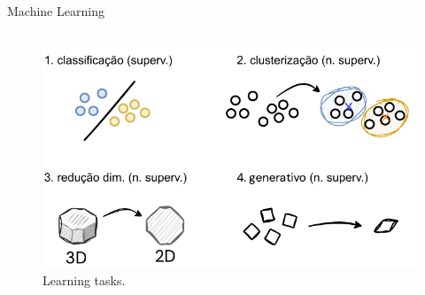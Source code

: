 \documentclass[aspectratio=169,xcolor=dvipsnames]{beamer}
\begin{document}
\begin{frame}{Machine Learning}
\begin{columns}[c]
        \begin{figure}
            \centering
            \includegraphics[width=1\textwidth]{imgs/leaning-tasks.pdf}
            \caption{Learning tasks.}
        \end{figure}



    \end{columns}
\end{frame}
\end{document}
